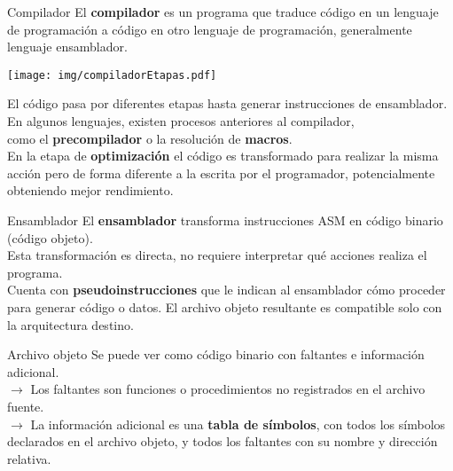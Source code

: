 \documentclass[aspectratio=169]{beamer}
\begin{document}
\begin{frame}[fragile,t]{Compilador}
    El \textbf{compilador} es un programa que traduce código en un lenguaje de programación a código en otro lenguaje de programación, generalmente lenguaje ensamblador.\\
    \begin{center}
    \texttt{[image: img/compiladorEtapas.pdf]}
    \end{center}
    El código pasa por diferentes etapas hasta generar instrucciones de ensamblador.\\
    \bigskip
    \pause
    En algunos lenguajes, existen procesos anteriores al compilador,\\
    como el \textbf{precompilador} o la resolución de \textbf{macros}.\\
    \bigskip
    \pause
    En la etapa de \textbf{optimización} el código es transformado para realizar la misma acción pero de forma diferente a la escrita por el programador, potencialmente obteniendo mejor rendimiento.
\end{frame}

\begin{frame}[fragile,t]{Ensamblador}
    El \textbf{ensamblador} transforma instrucciones ASM en código binario (código objeto).\\
    \bigskip
    \pause
    Esta transformación es directa, no requiere interpretar qué acciones realiza el programa.\\
    \bigskip
    \pause
    Cuenta con \textbf{pseudoinstrucciones} que le indican al ensamblador cómo proceder para generar código o datos.
    El archivo objeto resultante es compatible solo con la arquitectura destino.\\
    \bigskip
    \pause
    \begin{block}{Archivo objeto}
    Se puede ver como código binario con faltantes e información adicional.\\
    \vspace{0.2cm}
    $\rightarrow$ Los faltantes son funciones o procedimientos no registrados en el archivo fuente.\\
    \vspace{0.2cm}
    $\rightarrow$ La información adicional es una \textbf{tabla de símbolos}, con todos los símbolos declarados en el archivo objeto, y todos los faltantes con su nombre y dirección relativa.
    \end{block}
\end{frame}
\end{document}
